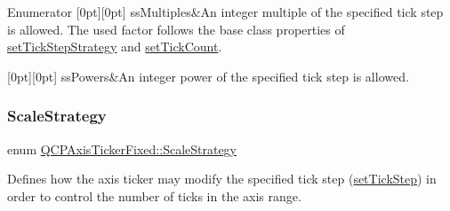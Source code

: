 \begin{DoxyEnumFields}{Enumerator}
[0pt][0pt]{}\mbox{\label{class_q_c_p_axis_ticker_fixed_a15b3d38b935d404b1311eb85cfb6a439a410f5c537f577b9dda33cb0152b756c6}} 
ss\+Multiples&An integer multiple of the specified tick step is allowed. The used factor follows the base class properties of \hyperlink{class_q_c_p_axis_ticker_a73b1d847c1a12159af6bfda4ebebe7d5}{set\+Tick\+Step\+Strategy} and \hyperlink{class_q_c_p_axis_ticker_a47752abba8293e6dc18491501ae34008}{set\+Tick\+Count}. \\
\hline

[0pt][0pt]{}\mbox{\label{class_q_c_p_axis_ticker_fixed_a15b3d38b935d404b1311eb85cfb6a439ab965e069729e3426a0b18c54a5ac6afd}} 
ss\+Powers&An integer power of the specified tick step is allowed. \\
\hline

\end{DoxyEnumFields}
\mbox{\label{class_q_c_p_axis_ticker_fixed_a15b3d38b935d404b1311eb85cfb6a439}} 
\subsubsection{\texorpdfstring{Scale\+Strategy}{ScaleStrategy}\hspace{0.1cm}{\footnotesize\ttfamily [2/2]}}
{\footnotesize\ttfamily enum \hyperlink{class_q_c_p_axis_ticker_fixed_a15b3d38b935d404b1311eb85cfb6a439}{Q\+C\+P\+Axis\+Ticker\+Fixed\+::\+Scale\+Strategy}}

Defines how the axis ticker may modify the specified tick step (\hyperlink{class_q_c_p_axis_ticker_fixed_a4bc83d85a4f81d4abdd3fa5042d7b833}{set\+Tick\+Step}) in order to control the number of ticks in the axis range.

